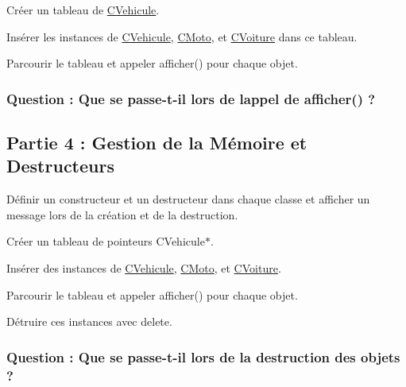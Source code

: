 \begin{DoxyItemize}
\item Créer un tableau de {\ttfamily \hyperlink{classCVehicule}{C\+Vehicule}}.
\item Insérer les instances de {\ttfamily \hyperlink{classCVehicule}{C\+Vehicule}}, {\ttfamily \hyperlink{classCMoto}{C\+Moto}}, et {\ttfamily \hyperlink{classCVoiture}{C\+Voiture}} dans ce tableau.
\item Parcourir le tableau et appeler {\ttfamily afficher()} pour chaque objet.
\end{DoxyItemize}

\subsubsection*{Question \+: Que se passe-\/t-\/il lors de l\textquotesingle{}appel de {\ttfamily afficher()} ?}

\subsection*{Partie 4 \+: Gestion de la Mémoire et Destructeurs}


\begin{DoxyItemize}
\item Définir un constructeur et un destructeur dans chaque classe et afficher un message lors de la création et de la destruction.
\item Créer un tableau de pointeurs {\ttfamily C\+Vehicule$\ast$}.
\item Insérer des instances de {\ttfamily \hyperlink{classCVehicule}{C\+Vehicule}}, {\ttfamily \hyperlink{classCMoto}{C\+Moto}}, et {\ttfamily \hyperlink{classCVoiture}{C\+Voiture}}.
\item Parcourir le tableau et appeler {\ttfamily afficher()} pour chaque objet.
\item Détruire ces instances avec {\ttfamily delete}.
\end{DoxyItemize}

\subsubsection*{Question \+: Que se passe-\/t-\/il lors de la destruction des objets ?}